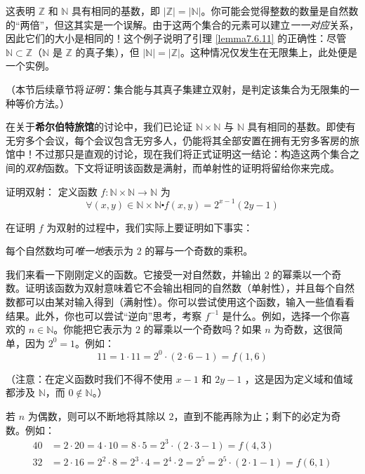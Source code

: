 这表明 $\mathbb{Z}$ 和 $\mathbb{N}$ 具有相同的基数，即 $|\mathbb{Z}| = |\mathbb{N}|$。你可能会觉得整数的数量是自然数的``两倍''，但这其实是一个误解。由于这两个集合的元素可以建立\emph{一一对应}关系，因此它们的大小是相同的！这个例子说明了引理 \ref{lemma7.6.11} 的正确性：尽管 $\mathbb{N} \subset \mathbb{Z}$（$\mathbb{N}$ 是 $\mathbb{Z}$ 的真子集），但 $|\mathbb{N}| = |\mathbb{Z}|$。这种情况仅发生在无限集上，此处便是一个实例。

（本节后续章节将\emph{证明}：集合能与其真子集建立双射，是判定该集合为无限集的一种等价方法。）

\begin{example}\label{ex:example7.6.13}

    在关于\textbf{希尔伯特旅馆}的讨论中，我们已论证 $\mathbb{N} \times \mathbb{N}$ 与 $\mathbb{N}$ 具有相同的基数。即使有无穷多个会议，每个会议包含无穷多人，仍能将其全部安置在拥有无穷多客房的旅馆中！不过那只是直观的讨论，现在我们将正式证明这一结论：构造这两个集合之间的\emph{双射}函数。下文将证明该函数是满射，而单射性的证明将留给你来完成。

    \begin{proofs}{证明双射：}
        定义函数 $f : \mathbb{N} \times \mathbb{N} \to \mathbb{N}$ 为
        \[\forall (x, y) \in \mathbb{N} \times \mathbb{N} \centerdot f(x, y) = 2^{x-1}(2y - 1)\]

        在证明 $f$ 为双射的过程中，我们实际上要证明如下事实：
        \begin{center}
            每个自然数均可\emph{唯一地}表示为 $2$ 的幂与一个奇数的乘积。
        \end{center}

        我们来看一下刚刚定义的函数。它接受一对自然数，并输出 $2$ 的幂乘以一个奇数。证明该函数为双射意味着它不会输出相同的自然数（单射性），并且每个自然数都可以由某对输入得到（满射性）。你可以尝试使用这个函数，输入一些值看看结果。此外，你也可以尝试``逆向''思考，考察 $f^{-1}$ 是什么。例如，选择一个你喜欢的 $n \in \mathbb{N}$。你能把它表示为 $2$ 的幂乘以一个奇数吗？如果 $n$ 为奇数，这很简单，因为 $2^0 = 1$。例如：
        \[11 = 1 \cdot 11 = 2^0 \cdot (2 \cdot 6 - 1) = f(1, 6)\]

        （注意：在定义函数时我们不得不使用 $x - 1$ 和 $2y - 1$ ，这是因为定义域和值域都涉及 $\mathbb{N}$，而 $0 \notin \mathbb{N}$。）

        若 $n$ 为偶数，则可以不断地将其除以 $2$，直到不能再除为止；剩下的必定为奇数。例如：
        \begin{align*}
            40 & = 2 \cdot 20 = 4 \cdot 10 = 8 \cdot 5 = 2^3 \cdot (2 \cdot 3 - 1) = f(4, 3)                        \\
            32 & = 2 \cdot 16 = 2^2 \cdot 8 = 2^3 \cdot 4 = 2^4 \cdot 2 = 2^5 = 2^5 \cdot (2 \cdot 1 - 1) = f(6, 1)
        \end{align*}


\end{proofs}
\end{example}

